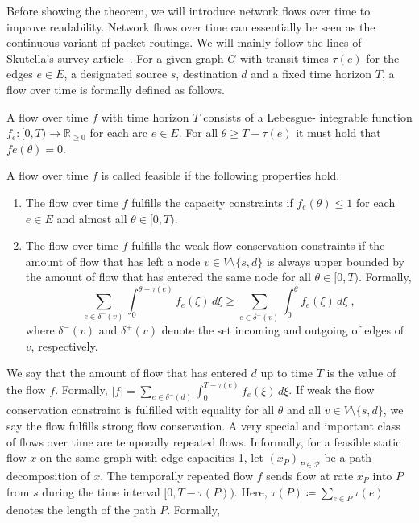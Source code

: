 Before showing the theorem, we will introduce network flows over time to improve readability. Network flows over time can essentially be seen as the continuous variant of packet routings. We will mainly follow the lines of Skutella's survey article~\cite{Skutella2009survey}. For a given graph $G$ with transit times $\tau(e)$ for the edges $e \in E$, a designated source $s$, destination $d$ and a fixed time horizon $T$, a flow over time is formally defined as follows.

\begin{definition}
A flow over time $f$ with time horizon $T$ consists of a Lebesgue-
integrable function $f_e : [0, T) \rightarrow \mathbb{R}_{\geq 0}$ for each arc $e \in E$. For all $\theta \geq T - \tau(e)$ it must hold that $fe(\theta) = 0$.
\end{definition}

\begin{definition}
    A flow over time $f$ is called feasible if the following properties hold.
    \begin{enumerate}
    \item The flow over time $f$ fulfills the capacity constraints if $f_e(\theta) \leq 1$ for
each $e \in E$ and almost all $\theta \in [0, T )$.
    \item The flow over time $f$ fulfills the weak flow conservation constraints if the amount of flow that has left a node $v \in V\setminus \{s,d\}$ is always upper bounded by the amount of flow that has entered the same node for all $\theta \in [0,T)$. Formally,
    \[\sum_{e \in \delta^-(v)}\int_0^{\theta - \tau(e)}f_e(\xi)\,d\xi \geq \sum_{e \in \delta^+(v)}\int_0^{\theta}f_e(\xi)\,d\xi\;,\]
    where $\delta^-(v)$ and $\delta^+(v)$ denote the set incoming and outgoing of edges of $v$, respectively.
    \end{enumerate}
\end{definition}

We say that the amount of flow that has entered $d$ up to time $T$ is the value of the flow $f$. Formally, $|f| = \sum_{e \in \delta^-(d)}\int_0^{T - \tau(e)}f_e(\xi)\,d\xi$. If weak the flow conservation constraint is fulfilled with equality for all $\theta$ and all $v \in V\setminus\{s,d\}$, we say the flow fulfills strong flow conservation. A very special and important class of flows over time are temporally repeated flows. Informally, for a feasible static flow $x$ on the same graph with edge capacities 1, let $(x_P)_{P\in \mathcal{P}}$ be a path decomposition of $x$. The temporally repeated flow $f$ sends flow at rate $x_P$ into $P$ from $s$ during the time interval $[0,T-\tau(P))$. Here, $\tau(P)\coloneqq \sum_{e \in P}{\tau(e)}$ denotes the length of the path $P$. Formally,


